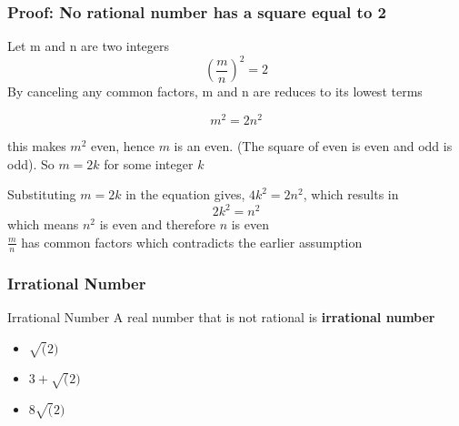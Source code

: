 \documentclass{beamer}
\begin{document}
\begin{frame}
    \frametitle{Proof: No rational number has a square equal to 2}
    Let m and n are two integers
    \[ 
        \left( \frac{m}{n} \right)^{2} = 2  
    \]
    By canceling any common factors, m and n are reduces to its lowest terms 

    \[
         m^{2} = 2n^{2}
    \]

    this makes \(m^{2}\) even, hence \(m\) is an even. (The square of even is even and odd is odd). So \(m = 2k\) for some integer \(k\)

    Substituting \(m = 2k\) in the equation gives, \(4k^{2} = 2n^{2} \), which results in 
    \[
        2k^{2} = n^{2}
    \]
    which means \( n^{2}\) is even and therefore \(n \) is even
    \\
    \(\frac{m}{n} \) has common factors which contradicts the earlier assumption
\end{frame}
\begin{frame}
    \frametitle{Irrational Number}

    \begin{block}{Irrational Number}
        A real number that is not rational is \textbf{irrational number}
    \end{block}
    \begin{itemize}
        \item \( \sqrt(2)\)
        \item \(3+\sqrt(2)\)
        \item \(8\sqrt(2)\)
    \end{itemize}
\end{frame}
\end{document}
